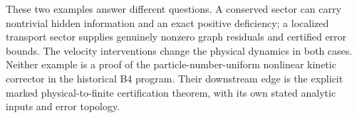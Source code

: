 These two examples answer different questions. A conserved sector can
carry nontrivial hidden information and an exact positive deficiency;
a localized transport sector supplies genuinely nonzero graph residuals
and certified error bounds. The velocity interventions change the
physical dynamics in both cases. Neither example is a proof of the
particle-number-uniform nonlinear kinetic corrector in the historical
B4 program. Their downstream edge is the explicit marked
physical-to-finite certification theorem, with its own stated analytic
inputs and error topology.
